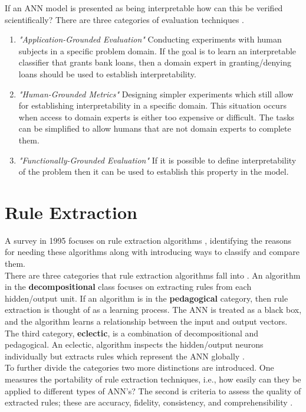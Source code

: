 If an ANN model is presented as being interpretable how can this be verified scientifically? There are three categories of evaluation techniques \cite{doshi2017towards}.
\begin{enumerate}
	\item \textit{"Application-Grounded Evaluation"} Conducting experiments with human subjects in a specific problem domain. If the goal is to learn an interpretable classifier that grants bank loans, then a domain expert in granting/denying loans should be used to establish interpretability.
	
	\item \textit{"Human-Grounded Metrics"} Designing simpler experiments which still allow for establishing interpretability in a specific domain. This situation occurs when access to domain experts is either too expensive or difficult. The tasks can be simplified to allow humans that are not domain experts to complete them.
	
	\item \textit{"Functionally-Grounded Evaluation"} If it is possible to define interpretability of the problem then it can be used to establish this property in the model.
\end{enumerate}


\section{Rule Extraction}

A survey in 1995 focuses on rule extraction algorithms \cite{andrews1995survey}, identifying the reasons for needing these algorithms along with introducing ways to classify and compare them.\\

There are three categories that rule extraction algorithms fall into \cite{andrews1995survey}. An algorithm in the \textbf{decompositional} class focuses on extracting rules from each hidden/output unit. If an algorithm is in the \textbf{pedagogical} category, then rule extraction is thought of as a learning process. The ANN is treated as a black box, and the algorithm learns a relationship between the input and output vectors. The third category, \textbf{eclectic}, is a combination of decompositional and pedagogical. An eclectic, algorithm inspects the hidden/output neurons individually but extracts rules which represent the ANN globally \cite{tickle1998truth}.\\

To further divide the categories two more distinctions are introduced. One measures the portability of rule extraction techniques, i.e., how easily can they be applied to different types of ANN's? The second is criteria to assess the quality of extracted rules; these are accuracy, fidelity, consistency, and comprehensibility \cite{andrews1995survey}.

